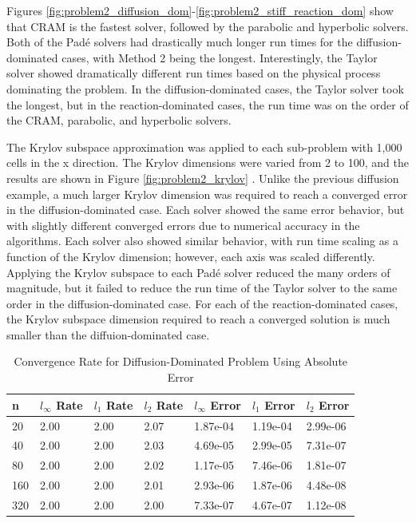 Figures \ref{fig:problem2_diffusion_dom}-\ref{fig:problem2_stiff_reaction_dom} show that CRAM is the fastest solver, followed by the parabolic and hyperbolic solvers. Both of the Pad\'e solvers had drastically much longer run times for the diffusion-dominated cases, with Method 2 being the longest. Interestingly, the Taylor solver showed dramatically different run times based on the physical process dominating the problem. In the diffusion-dominated cases, the Taylor solver took the longest, but in the reaction-dominated cases, the run time was on the order of the CRAM, parabolic, and hyperbolic solvers. 

The Krylov subspace approximation was applied to each sub-problem with 1,000 cells in the x direction. The Krylov dimensions were varied from 2 to 100, and the results are shown in Figure \ref{fig:problem2_krylov} . Unlike the previous diffusion example, a much larger Krylov dimension was required to reach a converged error in the diffusion-dominated case. Each solver showed the same error behavior, but with slightly different converged errors due to numerical accuracy in the algorithms. Each solver also showed similar behavior, with run time scaling as a function of the Krylov dimension; however, each axis was scaled differently. Applying the Krylov subspace to each Pad\'e solver reduced the many orders of magnitude, but it failed to reduce the run time of the Taylor solver to the same order in the diffusion-dominated case. For each of the reaction-dominated cases, the Krylov subspace dimension required to reach a converged solution is much smaller than the diffuion-dominated case. 

\clearpage

\begin{table}[h]
   \caption{\label{tab:diffusion_spatial_convergence_diffusion_dom} Convergence Rate for Diffusion-Dominated Problem Using Absolute Error}
   \centering
   \begin{tabular}{lllllll}
   \hline
    n & $l_{\infty}$ Rate & $l_{1}$ Rate & $l_{2}$ Rate &$l_{\infty}$ Error &$l_{1}$ Error & $l_{2}$ Error\\
   \hline
   20 & 2.00 & 2.00 & 2.07 & 1.87e-04 & 1.19e-04 & 2.99e-06  \\
   40 & 2.00 & 2.00 & 2.03 & 4.69e-05 & 2.99e-05 & 7.31e-07 \\
   80 & 2.00 & 2.00 & 2.02 & 1.17e-05 & 7.46e-06 & 1.81e-07 \\
   160 & 2.00 & 2.00 & 2.01 & 2.93e-06 & 1.87e-06 & 4.48e-08 \\
   320 & 2.00 & 2.00 & 2.00 & 7.33e-07 & 4.67e-07 & 1.12e-08 \\
   \hline
   \end{tabular}
\end{table}

